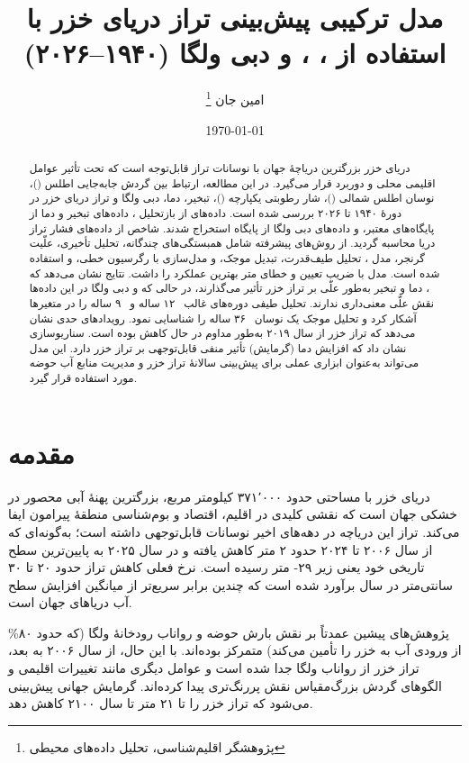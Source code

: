 \documentclass[12pt,a4paper]{article}
\title{مدل ترکیبی پیش‌بینی تراز دریای خزر با استفاده از \lr{AMOC}، \lr{NAO}، \lr{IVT} و دبی ولگا (۱۹۴۰–۲۰۲۶)}
\author{امین جان \thanks{پژوهشگر اقلیم‌شناسی، تحلیل داده‌های محیطی}}
\date{\today}
\begin{document}
\makeatletter
\newcommand{\UseMathForPositioningText}{}\makeatother
\maketitle

\begin{abstract}
دریای خزر بزرگترین دریاچهٔ جهان با نوسانات تراز قابل‌توجه است که تحت تأثیر عوامل اقلیمی محلی و دوربرد قرار می‌گیرد. در این مطالعه، ارتباط بین گردش جابه‌جایی اطلس ()، نوسان اطلس شمالی ()، شار رطوبتی یکپارچه ()، تبخیر، دما، دبی ولگا و تراز دریای خزر در دورهٔ ۱۹۴۰ تا ۲۰۲۶ بررسی شده است. داده‌های  از بازتحلیل ، داده‌های تبخیر و دما از پایگاه‌های معتبر، و داده‌های دبی ولگا از پایگاه  استخراج شدند. شاخص  از داده‌های فشار تراز دریا محاسبه گردید. از روش‌های پیشرفته شامل همبستگی‌های چندگانه، تحلیل تأخیری، علّیت گرنجر، مدل ، تحلیل طیف‌قدرت، تبدیل موجک، و مدل‌سازی با رگرسیون خطی،  و  استفاده شده است. مدل  با ضریب تعیین  و خطای  متر بهترین عملکرد را داشت. نتایج نشان می‌دهد که ، دما و تبخیر به‌طور علّی بر تراز خزر تأثیر می‌گذارند، در حالی که  و دبی ولگا در این داده‌ها نقش علّی معنی‌داری ندارند. تحلیل طیفی دوره‌های غالب ~۱۲ ساله و ~۹ ساله را در متغیرها آشکار کرد و تحلیل موجک یک نوسان ~۳۶ ساله را شناسایی نمود. رویدادهای حدی نشان می‌دهد که تراز خزر از سال ۲۰۱۹ به‌طور مداوم در حال کاهش بوده است. سناریوسازی نشان داد که افزایش دما (گرمایش) تأثیر منفی قابل‌توجهی بر تراز خزر دارد. این مدل می‌تواند به‌عنوان ابزاری عملی برای پیش‌بینی سالانهٔ تراز خزر و مدیریت منابع آب حوضه مورد استفاده قرار گیرد.
\end{abstract}

\section{مقدمه}
دریای خزر با مساحتی حدود ۳۷۱٬۰۰۰ کیلومتر مربع، بزرگترین پهنهٔ آبی محصور در خشکی جهان است که نقشی کلیدی در اقلیم، اقتصاد و بوم‌شناسی منطقهٔ پیرامون ایفا می‌کند. تراز این دریاچه در دهه‌های اخیر نوسانات قابل‌توجهی داشته است؛ به‌گونه‌ای که از سال ۲۰۰۶ تا ۲۰۲۴ حدود ۲ متر کاهش یافته و در سال ۲۰۲۵ به پایین‌ترین سطح تاریخی خود یعنی زیر ۲۹- متر رسیده است. نرخ فعلی کاهش تراز حدود ۲۰ تا ۳۰ سانتی‌متر در سال برآورد شده است که چندین برابر سریع‌تر از میانگین افزایش سطح آب دریاهای جهان است.

پژوهش‌های پیشین عمدتاً بر نقش بارش حوضه و رواناب رودخانهٔ ولگا (که حدود ۸۰\% از ورودی آب به خزر را تأمین می‌کند) متمرکز بوده‌اند. با این حال، از سال ۲۰۰۶ به بعد، تراز خزر از رواناب ولگا جدا شده است و عوامل دیگری مانند تغییرات اقلیمی و الگوهای گردش بزرگ‌مقیاس نقش پررنگ‌تری پیدا کرده‌اند. گرمایش جهانی پیش‌بینی می‌شود که تراز خزر را تا ۲۱ متر تا سال ۲۱۰۰ کاهش دهد. 
\end{document}
